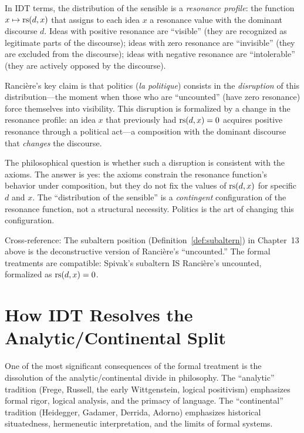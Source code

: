 \begin{interpretation}
In IDT terms, the distribution of the sensible is a \emph{resonance
profile}: the function $x \mapsto \mathrm{rs}(d, x)$ that assigns to each idea $x$
a resonance value with the dominant discourse $d$. Ideas with positive
resonance are ``visible'' (they are recognized as legitimate parts of the
discourse); ideas with zero resonance are ``invisible'' (they are excluded
from the discourse); ideas with negative resonance are ``intolerable''
(they are actively opposed by the discourse).

Rancière's key claim is that politics (\textit{la politique}) consists
in the \emph{disruption} of this distribution---the moment when those
who are ``uncounted'' (have zero resonance) force themselves into
visibility. This disruption is formalized by a change in the resonance
profile: an idea $x$ that previously had $\mathrm{rs}(d, x) = 0$ acquires
positive resonance through a political act---a composition with the
dominant discourse that \emph{changes} the discourse.

The philosophical question is whether such a disruption is consistent
with the axioms. The answer is yes: the axioms constrain the resonance
function's behavior under composition, but they do not fix the values
of $\mathrm{rs}(d, x)$ for specific $d$ and $x$. The ``distribution of the
sensible'' is a \emph{contingent} configuration of the resonance function,
not a structural necessity. Politics is the art of changing this
configuration.

Cross-reference: The subaltern position (Definition~\ref{def:subaltern})
in Chapter~13 above is the deconstructive version of Rancière's
``uncounted.'' The formal treatments are compatible: Spivak's subaltern
IS Rancière's uncounted, formalized as $\mathrm{rs}(d, x) = 0$.
\end{interpretation}

\section{How IDT Resolves the Analytic/Continental Split}

One of the most significant consequences of the formal treatment is the
dissolution of the analytic/continental divide in philosophy. The ``analytic''
tradition (Frege, Russell, the early Wittgenstein, logical positivism) emphasizes
formal rigor, logical analysis, and the primacy of language. The ``continental''
tradition (Heidegger, Gadamer, Derrida, Adorno) emphasizes historical
situatedness, hermeneutic interpretation, and the limits of formal systems.

